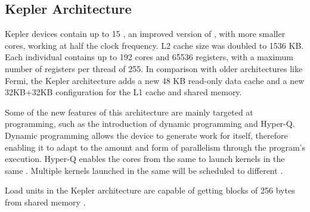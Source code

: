 \documentclass[../thesis]{subfiles}
\begin{document}
	\subsection{\nvidia Kepler Architecture}
	\label{subsec:cuda:arch:kepler}
	
	Kepler devices contain up to 15 \smx, an improved version of \sm, with more smaller cores, working at half the clock frequency. L2 cache size was doubled to 1536 KB. Each individual \smx contains up to 192 cores and 65536 registers, with a maximum number of registers per thread of 255. In comparison with older architectures like Fermi, the Kepler architecture adds a new 48 KB read-only data cache and a new 32KB+32KB configuration for the L1 cache and shared memory.

	Some of the new features of this architecture are mainly targeted at programming, such as the introduction of dynamic programming and Hyper-Q. Dynamic programming allows the device to generate work for itself, therefore enabling it to adapt to the amount and form of parallelism through the program's execution. Hyper-Q enables the cores from the same \cpu to launch kernels in the same \gpu. Multiple kernels launched in the same \gpu will be scheduled to different \smx.

	Load units in the Kepler architecture are capable of getting blocks of 256 bytes from shared memory \cite{NVIDIA:KEPLER}.
\end{document}
